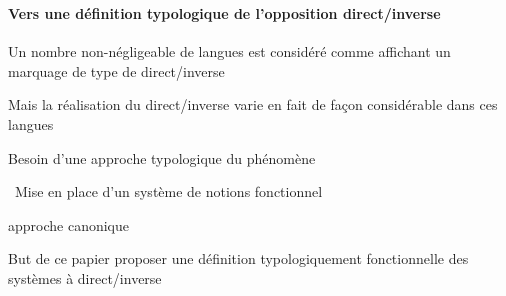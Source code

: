 \begin{frame}
\frametitle{}
\framesubtitle{Vers une définition typologique de l'opposition direct/inverse}
\begin{wideitemize}
\item Un nombre non-négligeable de langues est considéré comme affichant un marquage de
  type de direct/inverse
\item Mais la réalisation du direct/inverse varie en fait de façon
  considérable dans ces langues\\ 
\item[\highlighti{\lefthand}] Besoin d'une approche typologique du phénomène
\end{wideitemize}
\begin{wideitemize}
\item[\highlightiv{\lefthand}]~Mise en place d'un système de notions fonctionnel
\item[\highlightiv{\lefthand}] approche canonique
\end{wideitemize}
\begin{wideitemize}
\item[\highlightii{\lefthand}] But de ce papier {\ra} proposer une définition typologiquement
  fonctionnelle des systèmes à direct/inverse
\end{wideitemize}
\end{frame}